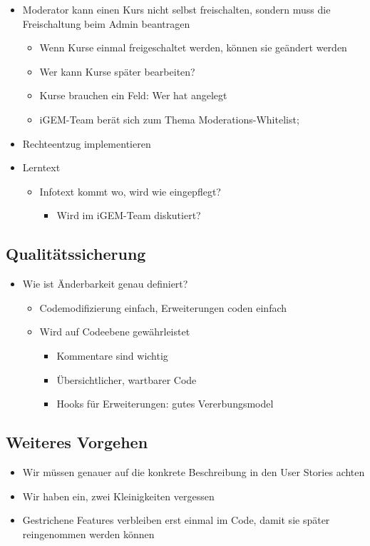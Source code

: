 \documentclass[colorback, accentcolor=tud1c, paper=a4]{tudexercise}
\begin{document}
\begin{multicols}{2}
\begin{itemize}
\begin{itemize}
	\end{itemize}
	\item Moderator kann einen Kurs nicht selbst freischalten, sondern muss die Freischaltung beim Admin beantragen
	\begin{itemize}
		\item Wenn Kurse einmal freigeschaltet werden,  können sie geändert werden
		\item Wer kann Kurse später bearbeiten?
		\item Kurse brauchen ein Feld: Wer hat angelegt
		\item iGEM-Team berät sich zum Thema Moderations-Whitelist;
	\end{itemize}
	\item Rechteentzug implementieren
	\item Lerntext
	\begin{itemize}
		\item Infotext kommt wo, wird wie eingepflegt?
		\begin{itemize}
			\item Wird im iGEM-Team diskutiert?
		\end{itemize}
	\end{itemize}
\end{itemize}

\subsection*{Qualitätssicherung}
\begin{itemize}
	\item Wie ist Änderbarkeit genau definiert?
	\begin{itemize}
		\item Codemodifizierung einfach, Erweiterungen coden einfach
		\item Wird auf Codeebene gewährleistet
		\begin{itemize}
			\item Kommentare sind wichtig
			\item Übersichtlicher, wartbarer Code
			\item Hooks für Erweiterungen: gutes Vererbungsmodel
		\end{itemize}
	\end{itemize}
\end{itemize}
		
\subsection*{Weiteres Vorgehen}
\begin{itemize}
	\item Wir müssen genauer auf die konkrete Beschreibung in den User Stories achten
	\item Wir haben ein, zwei Kleinigkeiten vergessen
	\item Gestrichene Features verbleiben erst einmal im Code, damit sie später reingenommen werden können
\end{itemize}
\end{multicols}
	
\end{document}
